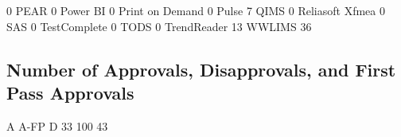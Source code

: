 \documentclass{article}
\begin{document}
\begin{Schunk}
\begin{Soutput}
                                       0
                                    PEAR
                                       0
                                Power BI
                                       0
                         Print on Demand
                                       0
                                   Pulse
                                       7
                                    QIMS
                                       0
                         Reliasoft Xfmea
                                       0
                                     SAS
                                       0
                            TestComplete
                                       0
                                    TODS
                                       0
                             TrendReader
                                      13
                                  WWLIMS
                                      36
\end{Soutput}
\end{Schunk}

\subsection{Number of Approvals, Disapprovals, and First Pass Approvals}

\begin{Schunk}
\begin{Soutput}
   A A-FP    D
  33  100   43
\end{Soutput}
\end{Schunk}
\end{document}
